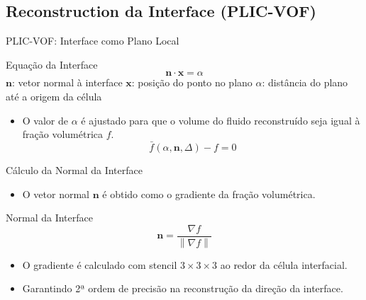 \documentclass[../main/main.tex]{subfiles}
\begin{document}
\subsection{Reconstruction da Interface (PLIC-VOF)}

\begin{frame}{PLIC-VOF: Interface como Plano Local}
  \vspace{-2cm}
  \begin{block}{Equação da Interface}
    \[
      \mathbf{n} \cdot \mathbf{x} = \alpha
    \]
    \scriptsize
    \(\mathbf{n}\): vetor normal à interface \hfill \(\mathbf{x}\): posição do ponto no plano \hfill
    \(\alpha\): distância do plano até a origem da célula
  \end{block}

  \begin{itemize}
    \item O valor de \(\alpha\) é ajustado para que o volume do fluido reconstruído seja igual à fração volumétrica \( f \).
    \[
      \bar{f}(\alpha, \mathbf{n}, \Delta) - f = 0
    \]
  \end{itemize}
\end{frame}

\begin{frame}{Cálculo da Normal da Interface}
  \begin{itemize}
    \item O vetor normal \(\mathbf{n}\) é obtido como o gradiente da fração volumétrica.
  \end{itemize}

  \vspace{-3cm}
  \begin{block}{Normal da Interface}
    \[
      \mathbf{n} = \frac{\nabla f}{\left\lVert \nabla f \right\rVert}
    \]
  \end{block}

  \begin{itemize}
    \small
    \item O gradiente é calculado com stencil $3 \times 3 \times 3$ ao redor da célula interfacial.
    \item Garantindo 2ª ordem de precisão na reconstrução da direção da interface.
  \end{itemize}
\end{frame}
\end{document}
